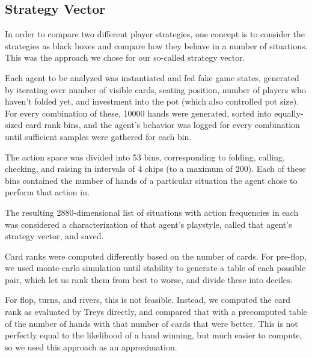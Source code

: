 \subsection{Strategy Vector}

In order to compare two different player strategies, one concept is to consider the strategies as black boxes and compare how they behave in a number of situations. This was the approach we chose for our so-called strategy vector.

Each agent to be analyzed was instantiated and fed fake game states, generated by iterating over number of visible cards, seating position, number of players who haven't folded yet, and investment into the pot (which also controlled pot size). For every combination of these, 10000 hands were generated, sorted into equally-sized card rank bins, and the agent's behavior was logged for every combination until sufficient samples were gathered for each bin.

The action space was divided into 53 bins, corresponding to folding, calling, checking, and raising in intervals of 4 chips (to a maximum of 200). Each of these bins contained the number of hands of a particular situation the agent chose to perform that action in.

The resulting  2880-dimensional list of situations with action frequencies in each was considered a characterization of that agent's playstyle, called that agent's strategy vector, and saved.


Card ranks were computed differently based on the number of cards. For pre-flop, we used monte-carlo simulation until stability to generate a table of each possible pair, which let us rank them from best to worse, and divide these into deciles.

For flop, turns, and rivers, this is not feasible. Instead, we computed the card rank as evaluated by Treys \cite{Treys} directly, and compared that with a precomputed table of the number of hands with that number of cards that were better. This is not perfectly equal to the likelihood of a hand winning, but much easier to compute, so we used this approach as an approximation. 


